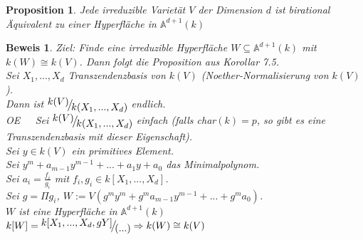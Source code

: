 \documentclass[a4paper,12pt]{report}
\theoremstyle{break}
\newtheorem{Prop}[Def]{Proposition}
\theoremstyle{nonumberbreak}
\theoremstyle{nonumberplain}
\newtheorem{Bew}{Beweis}
\newcommand{\FakRaum}[2]{
  \raisebox{0.7ex}{\ensuremath{#1}}
  \ensuremath{\mkern-3mu}\big/\ensuremath{\mkern-3mu}
  \raisebox{-0.6ex}{\ensuremath{#2}}}
\renewcommand{\OE}{O\!\!E~}
\begin{document}
\begin{Prop}
\label{prop:17.2}
Jede irreduzible Varietät $V$ der Dimension $d$ ist birational Äquivalent zu einer Hyperfläche in $\mathbb{A}^{d+1}(k)$
\end{Prop}
\begin{Bew}
Ziel: Finde eine irreduzible Hyperfläche $W\subseteq\mathbb{A}^{d+1}(k)$ mit $k(W)\cong k(V)$. Dann folgt die Proposition aus Korollar 7.5.\\
Sei $X_1,...,X_d$ Transzendenzbasis von $k(V)$ (Noether-Normalisierung von $k(V)$).\\
Dann ist $\FakRaum{k(V)}{k(X_1,...,X_d)}$ endlich.\\
\OE~~Sei $\FakRaum{k(V)}{k(X_1,...,X_d)}$ einfach (falls char$(k)=p$, so gibt es eine Transzendenzbasis mit dieser Eigenschaft).\\
Sei $y\in k(V)$ ein primitives Element.\\
Sei $y^m+a_{m-1}y^{m-1}+...+a_1y+a_0$ das Minimalpolynom.\\
Sei $a_i=\frac{f_i}{g_i}$ mit $f_i, g_i\in k[X_1,...,X_d]$.\\
Sei $g=\Pi g_i$, $W:=V(g^my^m+g^ma_{m-1}y^{m-1}+...+g^ma_0)$.\\
$W$ ist eine Hyperfläche in $\mathbb{A}^{d+1}(k)$\\
$k[W]=\FakRaum{k[X_1,...,X_d,gY]}{(...)}\Rightarrow k(W)\cong k(V)$
\end{Bew}
\end{document}
